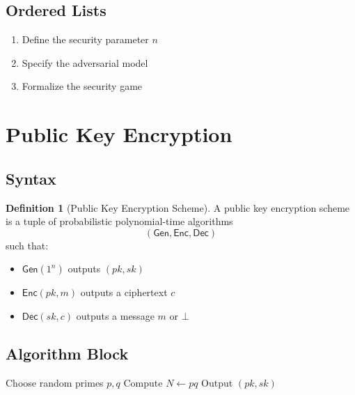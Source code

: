 \documentclass[11pt]{article}
\theoremstyle{definition}
\newtheorem{definition}{Definition}[section]
\theoremstyle{proof}
\newcommand{\Gen}{\mathsf{Gen}}
\newcommand{\Enc}{\mathsf{Enc}}
\newcommand{\Dec}{\mathsf{Dec}}
\begin{document}
\subsection{Ordered Lists}

\begin{enumerate}
    \item Define the security parameter $n$
    \item Specify the adversarial model
    \item Formalize the security game
\end{enumerate}

\section{Public Key Encryption}

\subsection{Syntax}

\begin{definition}[Public Key Encryption Scheme]
A public key encryption scheme is a tuple of probabilistic polynomial-time algorithms
\[
(\Gen, \Enc, \Dec)
\]
such that:
\begin{itemize}
    \item $\Gen(1^n)$ outputs $(pk, sk)$
    \item $\Enc(pk, m)$ outputs a ciphertext $c$
    \item $\Dec(sk, c)$ outputs a message $m$ or $\bot$
\end{itemize}
\end{definition}

\subsection{Algorithm Block}

\begin{algorithm}[H]
\caption{Key Generation $\Gen(1^n)$}
\begin{algorithmic}[1]
\State Choose random primes $p, q$
\State Compute $N \gets pq$
\State Output $(pk, sk)$
\end{algorithmic}
\end{algorithm}
\end{document}
